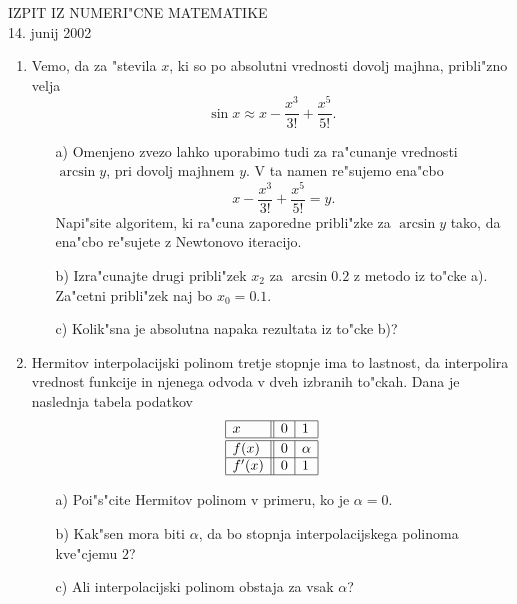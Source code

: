 \documentclass[12pt,a4paper]{article}
\begin{document}
\begin{center}
  IZPIT IZ NUMERI"CNE MATEMATIKE\\
  14. junij 2002
\end{center}

\begin{enumerate}

  \item Vemo, da za "stevila $x$, ki so po absolutni vrednosti dovolj majhna,
    pribli"zno velja
    $$\sin{x}\approx x-\frac{x^3}{3!}+\frac{x^5}{5!}.$$
    \begin{itemize}
       \item[a)] Omenjeno zvezo lahko uporabimo tudi za ra"cunanje vrednosti
        $\arcsin{y}$, pri dovolj majhnem $y$. V ta namen re"sujemo
        ena"cbo
        $$x-\frac{x^3}{3!}+\frac{x^5}{5!}=y.$$
        Napi"site algoritem, ki ra"cuna zaporedne pribli"zke za $\arcsin{y}$
        tako, da ena"cbo re"sujete z Newtonovo iteracijo.
       \item[b)]
        Izra"cunajte drugi pribli"zek $x_2$ za $\arcsin{0.2}$ z metodo iz
        to"cke a). Za"cetni pribli"zek naj bo $x_0=0.1$.
       \item[c)] Kolik"sna je absolutna napaka rezultata iz to"cke b)?
    \end{itemize}

  \item Hermitov interpolacijski polinom tretje stopnje ima to lastnost, da 
    interpolira vrednost funkcije in njenega odvoda v dveh izbranih to"ckah.
    Dana je naslednja tabela podatkov
    $$
        \begin{array}{|l||l|l|}
          \hline
          x & 0 & 1 \\ \hline\hline
          f(x) & 0 & \alpha \\ \hline
          f'(x) & 0 & 1\\ \hline
        \end{array}
    $$
     
     \begin{itemize}
      \item[a)] Poi"s"cite Hermitov polinom v primeru, ko je $\alpha=0$.
      \item[b)] Kak"sen mora biti $\alpha$, da bo stopnja interpolacijskega 
      polinoma kve"cjemu $2$?
      \item[c)] Ali interpolacijski polinom obstaja za vsak $\alpha$?
     \end{itemize}   
\end{enumerate}
\end{document}
